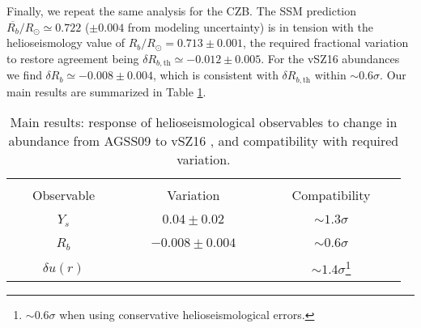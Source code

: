 \documentclass[aps,prl,twocolumn,showpacs]{revtex4}
\begin{document}
Finally, we repeat the same analysis for the CZB. The SSM prediction $\overline{R_b}/R_{\odot} \simeq 0.722$ ($\pm 0.004$ from modeling uncertainty) is in tension with the helioseismology value of $R_b/R_{\odot} = 0.713 \pm 0.001$, the required fractional variation to restore agreement being $\delta R_{b,\text{th}} \simeq -0.012 \pm 0.005$. For the vSZ16 abundances we find $\delta R_b \simeq -0.008 \pm 0.004$, which is consistent with $\delta R_{b,\text{th}}$ within $\sim 0.6\sigma$. Our main results are summarized in Table \ref{tab2}. %
\begin{table}[!h]
\caption{Main results: response of helioseismological observables to change in abundance from AGSS09 \cite{agss09} to vSZ16 \cite{z16}, and compatibility with required variation.}
\label{tab2}
\begin{tabular}{c c c}
\hline\hline \vspace{-4mm}\\
 \ \ \ Observable \ \ \ & \ \ \ Variation \ \ \ & \ \ \ Compatibility \ \ \ \\      
\hline
 \ \ \ $Y_s$ \ \ \ & \ \ \ $0.04 \pm 0.02$ \ \ \ & \ \ \ $\sim 1.3\sigma$ \ \ \ \\
 \ \ \ $R_b$ \ \ \ & \ \ \ $-0.008 \pm 0.004$ \ \ \ & \ \ \ $\sim 0.6\sigma$ \ \ \ \\
 \ \ \ $\delta u(r)$ \ \ \ & \ \ \  \ \ \ & \ \ \ $\sim 1.4\sigma$\footnote{$\sim 0.6\sigma$ when using conservative helioseismological errors.} \ \ \ \\
\hline
\end{tabular}
\end{table}
\end{document}
